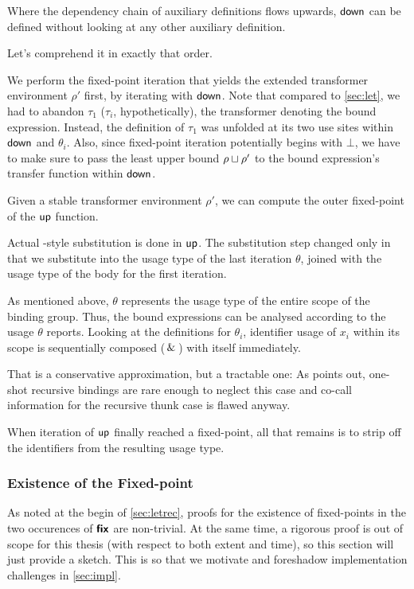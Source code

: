 Where the dependency chain of auxiliary definitions flows upwards, \eg $\mathsf{down}$ can be defined without looking at any other auxiliary definition.

Let's comprehend it in exactly that order.

We perform the fixed-point iteration that yields the extended transformer environment $\rho'$ first, by iterating with $\mathsf{down}$.
Note that compared to \cref{sec:let}, we had to abandon $\tau_1$ ($\tau_i$, hypothetically), the transformer denoting the bound expression.
Instead, the definition of $\tau_1$ was unfolded at its two use sites within $\mathsf{down}$ and $\theta_i$.
Also, since fixed-point iteration potentially begins with $\bot$, we have to make sure to pass the least upper bound $\rho \sqcup \rho'$ to the bound expression's transfer function within $\mathsf{down}$.

Given a stable transformer environment $\rho'$, we can compute the outer fixed-point of the $\mathsf{up}$ function.

Actual -style substitution is done in $\mathsf{up}$.
The substitution step changed only in that we substitute into the usage type of the last iteration $\theta$, joined with the usage type of the body for the first iteration.

As mentioned above, $\theta$ represents the usage type of the entire scope of the binding group.
Thus, the bound expressions can be analysed according to the usage $\theta$ reports.
Looking at the definitions for $\theta_i$, identifier usage of $x_i$ within its scope is sequentially composed ($\,\&\,$) with itself immediately.

That is a conservative approximation, but a tractable one:
As \textcite[102--104]{callarity} points out, one-shot recursive bindings are rare enough to neglect this case and co-call information for the recursive thunk case is flawed anyway.

When iteration of $\mathsf{up}$ finally reached a fixed-point, all that remains is to strip off the identifiers from the resulting usage type.

\subsubsection{Existence of the Fixed-point}\label{sec:fix}

As noted at the begin of \cref{sec:letrec}, proofs for the existence of fixed-points in the two occurences of $\text{\textsf{\textbf{fix}}}$ are non-trivial. 
At the same time, a rigorous proof is out of scope for this thesis (with respect to both extent and time), so this section will just provide a sketch.
This is so that we motivate and foreshadow implementation challenges in \cref{sec:impl}.\medskip


